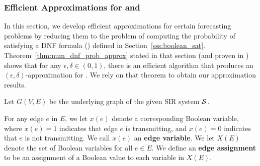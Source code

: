 

\subsubsection{Efficient Approximations for \tTotVuls{} and \tTotInfs{}}
\label{sec:vul}

In this section, we develop efficient 
approximations for certain forecasting problems by reducing them
to the problem of computing the probability of satisfying a DNF formula (\dnfsat)
defined in Section~\ref{sss:boolean_sat}.
Theorem~\ref{thm:num_dnf_prob_approx} 
stated in that section (and proven in \cite{karp:jc85}) shows that
for any $\epsilon, \delta\in(0,1)$, there is an efficient algorithm
that produces an $(\epsilon, \delta)$-approximation for \dnfsat.
We rely on that theorem to obtain our approximation results.

 
Let $G(V,E)$ be the underlying graph of the given SIR system $\mbox{${\cal S}$}{}$.

\begin{definition}\label{def:edge_assignment}
For any edge $e$ in $E$, we let $x(e)$ denote a corresponding Boolean variable,
where $x(e) =1$ indicates that edge $e$ is transmitting,
and $x(e) =0$ indicates that $e$  is not transmitting.
We call $x(e)$ an {\bf edge variable}.
We let $X(E)$ denote the set of Boolean variables for all $e \in E$.
We define an {\bf edge assignment} to be
an assignment of a Boolean value to each variable in $X(E)$.
\end{definition}

